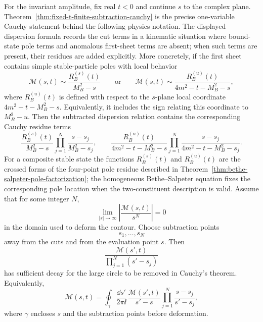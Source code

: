 For the invariant amplitude, fix real \(t<0\) and continue \(s\) to the
complex plane.  Theorem~\ref{thm:fixed-t-finite-subtraction-cauchy} is the
precise one-variable Cauchy statement behind the following physics notation.
The displayed dispersion formula records the cut terms in a kinematic
situation where bound-state pole terms and anomalous first-sheet terms are
absent; when such terms are present, their residues are added explicitly.
More concretely, if the first sheet contains simple stable-particle
poles with local behavior
\[
  \mathcal M(s,t)\sim\frac{R_B^{(s)}(t)}{M_B^2-s}
  \qquad\text{or}\qquad
  \mathcal M(s,t)\sim
  \frac{R_B^{(u)}(t)}{4m^2-t-M_B^2-s},
\]
where \(R_B^{(u)}(t)\) is defined with respect to the \(s\)-plane local
coordinate \(4m^2-t-M_B^2-s\).  Equivalently, it includes the sign relating this
coordinate to \(M_B^2-u\).
Then the subtracted dispersion relation contains the corresponding Cauchy
residue terms
\[
  \frac{R_B^{(s)}(t)}{M_B^2-s}
  \prod_{j=1}^N\frac{s-s_j}{M_B^2-s_j},
  \qquad
  \frac{R_B^{(u)}(t)}{4m^2-t-M_B^2-s}
  \prod_{j=1}^N
  \frac{s-s_j}{4m^2-t-M_B^2-s_j}.
\]
For a composite stable state the functions \(R_B^{(s)}(t)\) and
\(R_B^{(u)}(t)\) are the crossed forms of the four-point pole residue described
in Theorem~\ref{thm:bethe-salpeter-pole-factorization}; the homogeneous
Bethe--Salpeter equation fixes the corresponding pole location when the
two-constituent description is valid.  Assume that for some integer \(N\),
\[
  \lim_{|s|\to\infty}
  \left|\frac{\mathcal M(s,t)}{s^N}\right|=0
\]
in the domain used to deform the contour.  Choose subtraction points
\[
  s_1,\ldots,s_N
\]
away from the cuts and from the evaluation point \(s\).  Then
\[
  \frac{\mathcal M(s',t)}{\prod_{j=1}^N(s'-s_j)}
\]
has sufficient decay for the large circle to be removed in Cauchy's theorem.
Equivalently,
\[
  \mathcal M(s,t)
  =
  \oint_{\gamma}
  \frac{\dd s'}{2\pi\ii}\,
  \frac{\mathcal M(s',t)}{s'-s}
  \prod_{j=1}^N\frac{s-s_j}{s'-s_j},
\]
where \(\gamma\) encloses \(s\) and the subtraction points before deformation.

